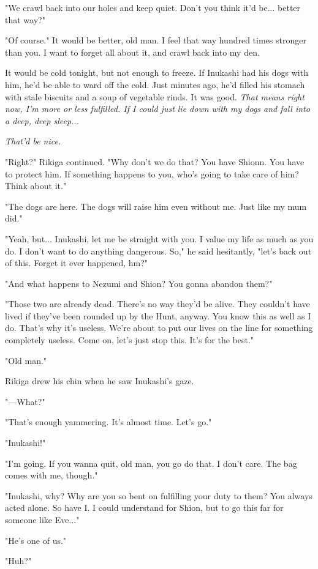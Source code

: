 "We crawl back into our holes and keep quiet. Don't you think it'd be...
better that way?"

"Of course." It would be better, old man. I feel that way hundred times
stronger than you. I want to forget all about it, and crawl back into my
den.

It would be cold tonight, but not enough to freeze. If Inukashi had his
dogs with him, he'd be able to ward off the cold. Just minutes ago, he'd
filled his stomach with stale biscuits and a soup of vegetable rinds. It
was good. \emph{That means right now, I'm more or less fulfilled. If I could
just lie down with my dogs and fall into a deep, deep sleep...}

\emph{That'd be nice.}

"Right?" Rikiga continued. "Why don't we do that? You have Shionn. You
have to protect him. If something happens to you, who's going to take
care of him? Think about it."

"The dogs are here. The dogs will raise him even without me. Just like
my mum did."

"Yeah, but... Inukashi, let me be straight with you. I value my life as
much as you do. I don't want to do anything dangerous. So," he said
hesitantly, "let's back out of this. Forget it ever happened, hm?"

"And what happens to Nezumi and Shion? You gonna abandon them?"

"Those two are already dead. There's no way they'd be alive. They
couldn't have lived if they've been rounded up by the Hunt, anyway. You
know this as well as I do. That's why it's useless. We're about to put
our lives on the line for something completely useless. Come on, let's
just stop this. It's for the best."

"Old man."

Rikiga drew his chin when he saw Inukashi's gaze.

"---What?"

"That's enough yammering. It's almost time. Let's go."

"Inukashi!"

"I'm going. If you wanna quit, old man, you go do that. I don't care.
The bag comes with me, though."

"Inukashi, why? Why are you so bent on fulfilling your duty to them? You
always acted alone. So have I. I could understand for Shion, but to go
this far for someone like Eve..."

"He's one of us."

"Huh?"

